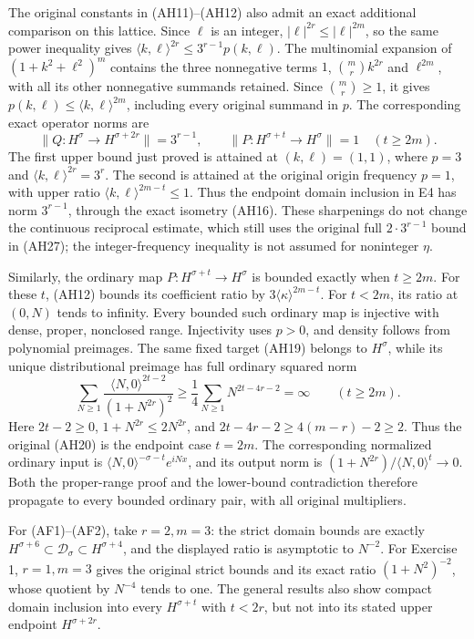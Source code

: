 \documentclass[
  11pt,
]{article}
\begin{document}
The original constants in (AH11)--(AH12) also admit an exact additional
comparison on this lattice. Since \(\ell\) is an integer,
\(|\ell|^{2r}\leq|\ell|^{2m}\), so the same power inequality gives
\(\langle k,\ell\rangle^{2r}\leq3^{r-1}p(k,\ell)\). The multinomial
expansion of \((1+k^2+\ell^2)^m\) contains the three nonnegative terms
\(1\), \(\binom mr k^{2r}\) and \(\ell^{2m}\), with all its other
nonnegative summands retained. Since \(\binom mr\geq1\), it gives
\(p(k,\ell)\leq\langle k,\ell\rangle^{2m}\), including every original
summand in \(p\). The corresponding exact operator norms are \[
 \|Q:H^\sigma\to H^{\sigma+2r}\|=3^{r-1},
 \qquad
 \|P:H^{\sigma+t}\to H^\sigma\|=1\quad(t\geq2m).
 \tag{AE13a}
\] The first upper bound just proved is attained at \((k,\ell)=(1,1)\),
where \(p=3\) and \(\langle k,\ell\rangle^{2r}=3^r\). The second is
attained at the original origin frequency \(p=1\), with upper ratio
\(\langle k,\ell\rangle^{2m-t}\leq1\). Thus the endpoint domain
inclusion in E4 has norm \(3^{r-1}\), through the exact isometry (AH16).
These sharpenings do not change the continuous reciprocal estimate,
which still uses the original full \(2\cdot3^{r-1}\) bound in (AH27);
the integer-frequency inequality is not assumed for noninteger \(\eta\).

Similarly, the ordinary map \(P:H^{\sigma+t}\to H^\sigma\) is bounded
exactly when \(t\geq2m\). For these \(t\), (AH12) bounds its coefficient
ratio by \(3\langle\kappa\rangle^{2m-t}\). For \(t<2m\), its ratio at
\((0,N)\) tends to infinity. Every bounded such ordinary map is
injective with dense, proper, nonclosed range. Injectivity uses \(p>0\),
and density follows from polynomial preimages. The same fixed target
(AH19) belongs to \(H^\sigma\), while its unique distributional preimage
has full ordinary squared norm \[
 \sum_{N\geq1}\frac{\langle N,0\rangle^{2t-2}}
                         {(1+N^{2r})^2}
 \geq\frac14\sum_{N\geq1}N^{2t-4r-2}=\infty
 \qquad(t\geq2m).
 \tag{AE14}
\] Here \(2t-2\geq0\), \(1+N^{2r}\leq2N^{2r}\), and
\(2t-4r-2\geq4(m-r)-2\geq2\). Thus the original (AH20) is the endpoint
case \(t=2m\). The corresponding normalized ordinary input is
\(\langle N,0\rangle^{-\sigma-t}e^{iNx}\), and its output norm is
\((1+N^{2r})/\langle N,0\rangle^t\to0\). Both the proper-range proof and
the lower-bound contradiction therefore propagate to every bounded
ordinary pair, with all original multipliers.

For (AF1)--(AF2), take \(r=2,m=3\): the strict domain bounds are exactly
\(H^{\sigma+6}\subset\mathcal D_\sigma\subset H^{\sigma+4}\), and the
displayed ratio is asymptotic to \(N^{-2}\). For Exercise 1, \(r=1,m=3\)
gives the original strict bounds and its exact ratio \((1+N^2)^{-2}\),
whose quotient by \(N^{-4}\) tends to one. The general results also show
compact domain inclusion into every \(H^{\sigma+t}\) with \(t<2r\), but
not into its stated upper endpoint \(H^{\sigma+2r}\).
\end{document}
